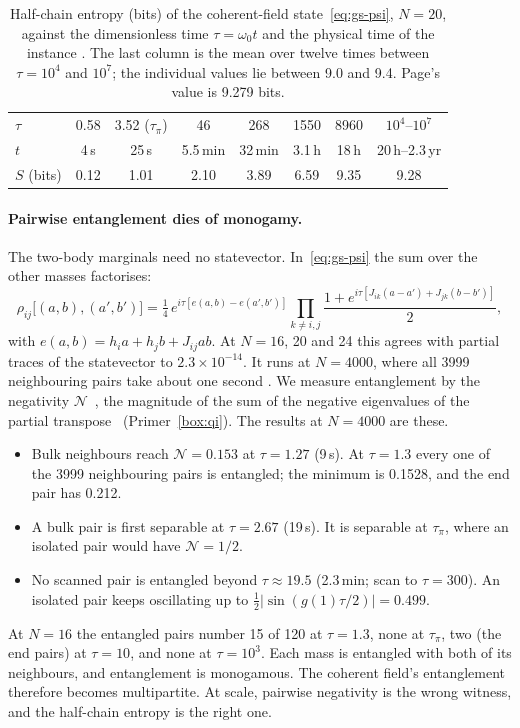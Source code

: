 \begin{table}[ht]\centering\small
\caption{Half-chain entropy (bits) of the coherent-field state~\eqref{eq:gs-psi}, $N=20$, against the dimensionless time $\tau=\omega_0t$
and the physical time of the instance . The last column is the mean over twelve times between $\tau=10^4$ and $10^7$; the
individual values lie between 9.0 and 9.4. Page's value is 9.279 bits.}\label{tab:gs-entropy}
\setlength{\tabcolsep}{5pt}
\begin{tabular}{@{}lccccccc@{}}\toprule
$\tau$ & 0.58 & 3.52 ($\tau_\pi$) & 46 & 268 & 1550 & 8960 & $10^4$--$10^7$\\
$t$ & 4\,s & 25\,s & 5.5\,min & 32\,min & 3.1\,h & 18\,h & 20\,h--2.3\,yr\\\midrule
$S$ (bits) & 0.12 & 1.01 & 2.10 & 3.89 & 6.59 & 9.35 & 9.28\\\bottomrule
\end{tabular}
\end{table}

\paragraph{Pairwise entanglement dies of monogamy.} The two-body marginals need no statevector. In~\eqref{eq:gs-psi} the sum over the other
masses factorises:
\begin{equation}\label{eq:gs-pair}
\rho_{ij}\bigl[(a,b),(a',b')\bigr]=\tfrac14\,e^{i\tau[e(a,b)-e(a',b')]}\prod_{k\ne i,j}\frac{1+e^{i\tau[J_{ik}(a-a')+J_{jk}(b-b')]}}{2},
\end{equation}
with $e(a,b)=h_ia+h_jb+J_{ij}ab$. At $N=16$, 20 and 24 this agrees with partial traces of the statevector to $2.3\times10^{-14}$. It runs at
$N=4000$, where all 3999 neighbouring pairs take about one second . We measure entanglement by the negativity
$\mathcal N$~\cite{vw}, the magnitude of the sum of the negative eigenvalues of the partial transpose~\cite{peres1996,horodecki1996}
(Primer~\ref{box:qi}). The results at $N=4000$ are these.
\begin{itemize}[nosep]
\item Bulk neighbours reach $\mathcal N=0.153$ at $\tau=1.27$ (9\,s). At $\tau=1.3$ every one of the 3999 neighbouring pairs is entangled;
the minimum is 0.1528, and the end pair has 0.212.
\item A bulk pair is first separable at $\tau=2.67$ (19\,s). It is separable at $\tau_\pi$, where an isolated pair would have
$\mathcal N=1/2$.
\item No scanned pair is entangled beyond $\tau\approx19.5$ (2.3\,min; scan to $\tau=300$). An isolated pair keeps oscillating up to
$\frac12|\sin(g(1)\tau/2)|=0.499$.
\end{itemize}
At $N=16$ the entangled pairs number 15 of 120 at $\tau=1.3$, none at $\tau_\pi$, two (the end pairs) at $\tau=10$, and none at $\tau=10^3$.
Each mass is entangled with both of its neighbours, and entanglement is monogamous. The coherent field's entanglement therefore becomes
multipartite. At scale, pairwise negativity is the wrong witness, and the half-chain entropy is the right one.


